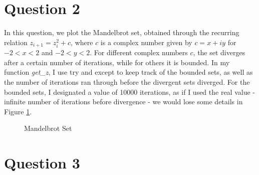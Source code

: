 \documentclass[10pt, preprint]{aastex}
\begin{document}
\section*{Question 2}

In this question, we plot the Mandelbrot set, obtained through the recurring relation $z_{i+1} = z_{i}^2 + c$, where $c$ is a complex number given by $c = x + iy$ for $-2 < x < 2$ and $-2 < y < 2$. For different complex numbers $c$, the set diverges after a certain number of iterations, while for others it is bounded. In my function \textit{get\_z}, I use try and except to keep track of the bounded sets, as well as the number of iterations ran through before the divergent sets diverged. For the bounded sets, I designated a value of 10000 iterations, as if I used the real value - infinite number of iterations before divergence - we would lose some details in Figure \ref{mandelbrot}.

\begin{figure}[h!]
    \centering
    \hfill
    \caption{Mandelbrot Set}
    \label{mandelbrot}
\end{figure}


\section*{Question 3}
\end{document}
